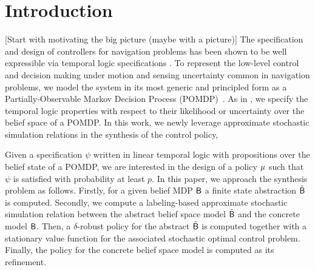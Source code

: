 \documentclass{ifacconf}
\newcommand{\red}[1]{{\color{red} #1}}
\renewcommand{\axx}[1]{{\color{orange} Ali:#1}}
\begin{document}
\section{Introduction }\label{subsec:intro}
\red{[Start with motivating the big picture (maybe with a picture)]}
The specification and design of controllers for navigation problems has  been shown to be well expressible via temporal logic specifications \citep{Murray2009}.      To represent the low-level control and decision making under motion and sensing uncertainty common in navigation problems, we model the system
    in its most generic and principled form as a Partially-Observable Markov Decision Process
    (POMDP)~\citep{Kaelbling98,Smallwood73}.
As in \citep{JonesDTL2013}, we specify the temporal logic properties with respect to their likelihood or uncertainty over the belief space of a POMDP.
In this work, we newly  leverage approximate stochastic simulation relations in the synthesis of  the control policy,  
 
 


Given a specification $\psi$  written in linear temporal logic with propositions over the belief state of a POMDP, we are interested 
in the design of a policy ${\mu}$ such that  $\psi$ is satisfied with probability at least $p$.
%
In this paper, we approach the synthesis problem as follows. 
Firstly,  for a given belief MDP $\mathsf{B}$ a finite state abstraction  $\tilde {\mathsf{B}}$ is computed.
Secondly,  we compute a labeling-based approximate stochastic  simulation relation between the abstract belief space model  $\tilde{\mathsf{B}}$ and the concrete model $\mathsf{B}$.
 Then,  a $\delta$-robust policy for the abstract $\tilde{\mathsf{B}}$ is computed  together with a stationary value function for the associated stochastic optimal control problem.
  Finally, the policy for the concrete belief space model is computed  as its refinement.
\end{document}

